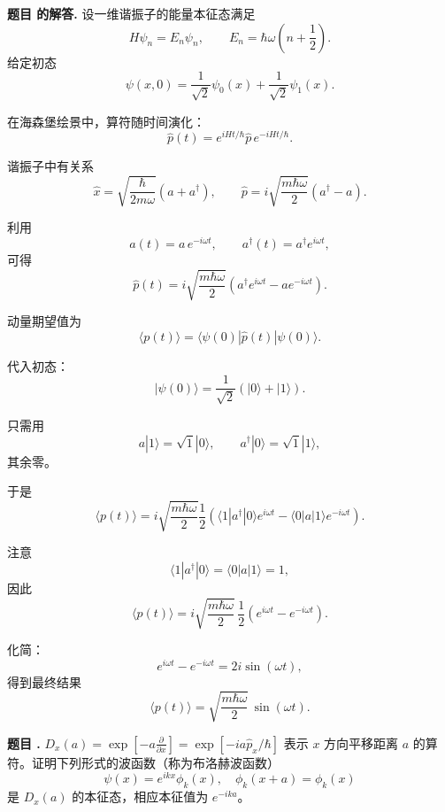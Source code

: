 \documentclass[12pt, a4paper, oneside]{ctexart}
\newcounter{problemname}
\newenvironment{problem}
  {\begin{shaded}\stepcounter{problemname}\par\noindent\textbf{题目 \theproblemname. }}
  {\end{shaded}\par}
\newenvironment{solution}
  {\par\noindent\textbf{题目 \theproblemname 的解答. }}
  {\par}
\begin{document}
\begin{solution}
  设一维谐振子的能量本征态满足
\[
H\psi_n = E_n\psi_n,\qquad E_n=\hbar\omega\left(n+\frac12\right).
\]
给定初态
\[
\psi(x,0)=\frac{1}{\sqrt{2}}\psi_0(x)+\frac{1}{\sqrt{2}}\psi_1(x).
\]

在海森堡绘景中，算符随时间演化：
\[
\hat{p}(t)=e^{iHt/\hbar}\hat{p}\,e^{-iHt/\hbar}.
\]

谐振子中有关系
\[
\hat{x}=\sqrt{\frac{\hbar}{2m\omega}}(a+a^\dagger),\qquad
\hat{p}=i\sqrt{\frac{m\hbar\omega}{2}}(a^\dagger-a).
\]

利用
\[
a(t)=a\,e^{-i\omega t},\qquad a^\dagger(t)=a^\dagger e^{i\omega t},
\]
可得
\[
\hat{p}(t)=i\sqrt{\frac{m\hbar\omega}{2}}\left(a^\dagger e^{i\omega t}-a e^{-i\omega t}\right).
\]

动量期望值为
\[
\langle p(t)\rangle
=\langle\psi(0)|\hat{p}(t)|\psi(0)\rangle.
\]

代入初态：
\[
|\psi(0)\rangle=\frac1{\sqrt2}(|0\rangle+|1\rangle).
\]

只需用
\[
a|1\rangle=\sqrt{1}|0\rangle,\qquad 
a^\dagger|0\rangle=\sqrt{1}|1\rangle,
\]
其余零。

于是
\[
\langle p(t)\rangle
= i\sqrt{\frac{m\hbar\omega}{2}}
\frac12\left(
\langle1|a^\dagger|0\rangle e^{i\omega t}
-\langle0|a|1\rangle e^{-i\omega t}
\right).
\]

注意
\[
\langle1|a^\dagger|0\rangle=\langle0|a|1\rangle=1,
\]
因此
\[
\langle p(t)\rangle
= i\sqrt{\frac{m\hbar\omega}{2}}\,
\frac12\left(e^{i\omega t}-e^{-i\omega t}\right).
\]

化简：
\[
e^{i\omega t}-e^{-i\omega t}=2i\sin(\omega t),
\]
得到最终结果
\[
\boxed{
\langle p(t)\rangle
= \sqrt{\frac{m\hbar\omega}{2}}\,\sin(\omega t)
}.
\]

\end{solution}

\begin{problem}
  $D_x(a) = \exp \left[-a \frac{\partial}{\partial x}\right] = \exp \left[-i a \hat{p}_x / \hbar\right]$ 表示 $x$ 方向平移距离 $a$ 的算符。证明下列形式的波函数（称为布洛赫波函数）
$$
\psi(x) = e^{i k x} \phi_k(x), \quad \phi_k(x+a) = \phi_k(x)
$$
是 $D_x(a)$ 的本征态，相应本征值为 $e^{-i k a}$。
\end{problem}
\end{document}
